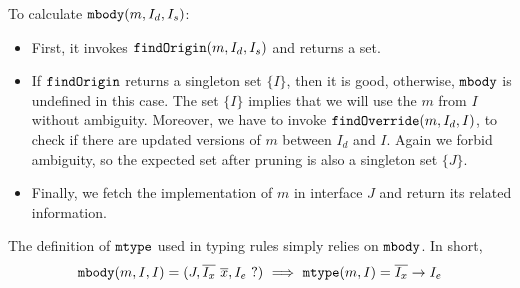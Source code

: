 To calculate $\texttt{mbody}(m, I_d, I_s)$:
\begin{itemize}
    \item First, it invokes $\texttt{findOrigin}(m, I_d, I_s)$ and returns a set.
    \item If $\texttt{findOrigin}$ returns a singleton set $\{I\}$, then it is good, otherwise, $\texttt{mbody}$ is undefined in
    this case. The set $\{I\}$ implies that we will use the $m$ from $I$ without ambiguity. Moreover, we have to invoke $\texttt{findOverride}(m, I_d, I)$, to check if there are updated versions of $m$ between $I_d$ and $I$. Again we forbid ambiguity, so the expected set after pruning is also a singleton set $\{J\}$.
    \item Finally, we fetch the implementation of $m$ in interface $J$ and return its related information.
\end{itemize}
The definition of $\texttt{mtype}$ used in typing rules simply relies on $\texttt{mbody}$. In short,
$$\texttt{mbody}(m, I, I) = (J, \overline{I_x}\ \overline{x}, I_e\ ?) \ \Longrightarrow\ \texttt{mtype}(m, I) = \overline{I_x}\rightarrow I_e$$

